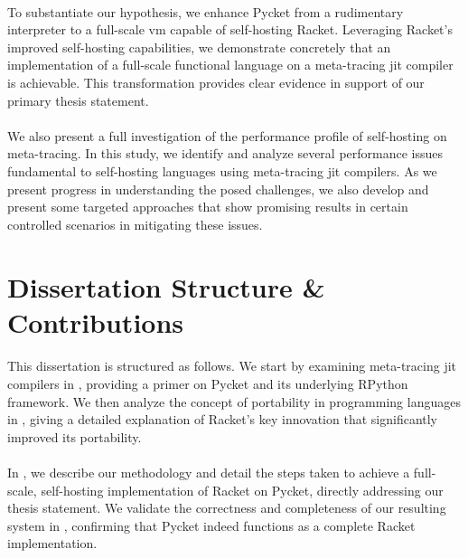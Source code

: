         \paragraph{}%
            To substantiate our hypothesis, we enhance Pycket from a rudimentary interpreter to a full-scale \gls{vm} capable of self-hosting Racket. Leveraging Racket's improved self-hosting capabilities, we demonstrate concretely that an implementation of a full-scale functional language on a meta-tracing \gls{jit} compiler is achievable. This transformation provides clear evidence in support of our primary thesis statement.

        \paragraph{}%
            We also present a full investigation of the performance profile of self-hosting on meta-tracing. In this study, we identify and analyze several performance issues fundamental to self-hosting languages using meta-tracing \gls{jit} compilers. As we present progress in understanding the posed challenges, we also develop and present some targeted approaches that show promising results in certain controlled scenarios in mitigating these issues.

    \section[\texorpdfstring{Dissertation Structure \& Contributions}{Structure \& Contributions}]{Dissertation Structure \& Contributions}

        \paragraph{}%
            This dissertation is structured as follows. We start by examining meta-tracing \gls{jit} compilers in , providing a primer on Pycket and its underlying RPython framework. We then analyze the concept of portability in programming languages in , giving a detailed explanation of Racket's key innovation that significantly improved its portability.

        \paragraph{}%
            In , we describe our methodology and detail the steps taken to achieve a full-scale, self-hosting implementation of Racket on Pycket, directly addressing our thesis statement. We validate the correctness and completeness of our resulting system in , confirming that Pycket indeed functions as a complete Racket implementation.

